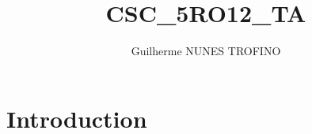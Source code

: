\documentclass{article}
\title{CSC\_5RO12\_TA}
\author{Guilherme NUNES TROFINO}
\begin{document}
\maketitle

\newpage\tableofcontents

\section{Introduction}











\end{document}
